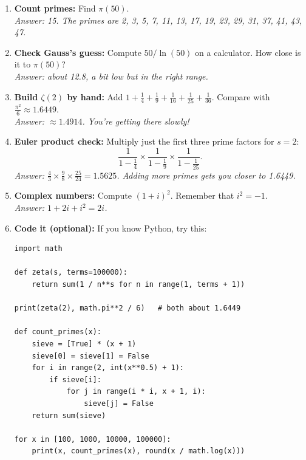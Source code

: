 \documentclass[11pt,a4paper]{article}
\begin{document}
\begin{enumerate}[itemsep=6pt]
  \item \textbf{Count primes:} Find $\pi(50)$.\\
  \emph{Answer: 15. The primes are 2, 3, 5, 7, 11, 13, 17, 19, 23, 29, 31, 37, 41, 43, 47.}

  \item \textbf{Check Gauss's guess:} Compute $50/\ln(50)$ on a calculator. How close is it to $\pi(50)$?\\
  \emph{Answer: about 12.8, a bit low but in the right range.}

  \item \textbf{Build $\zeta(2)$ by hand:} Add $1 + \frac14 + \frac19 + \frac1{16} + \frac1{25} + \frac1{36}$. Compare with $\frac{\pi^2}{6} \approx 1.6449$.\\
  \emph{Answer: $\approx 1.4914$. You're getting there slowly!}

  \item \textbf{Euler product check:} Multiply just the first three prime factors for $s = 2$:
  \[
  \frac{1}{1-\frac14}\times\frac{1}{1-\frac19}\times\frac{1}{1-\frac1{25}}.
  \]
  \emph{Answer: $\frac43\times\frac98\times\frac{25}{24} = 1.5625$. Adding more primes gets you closer to 1.6449.}

  \item \textbf{Complex numbers:} Compute $(1+i)^2$. Remember that $i^2 = -1$.\\
  \emph{Answer: $1 + 2i + i^2 = 2i$.}

  \item \textbf{Code it (optional):} If you know Python, try this:
\begin{lstlisting}
import math

def zeta(s, terms=100000):
    return sum(1 / n**s for n in range(1, terms + 1))

print(zeta(2), math.pi**2 / 6)   # both about 1.6449

def count_primes(x):
    sieve = [True] * (x + 1)
    sieve[0] = sieve[1] = False
    for i in range(2, int(x**0.5) + 1):
        if sieve[i]:
            for j in range(i * i, x + 1, i):
                sieve[j] = False
    return sum(sieve)

for x in [100, 1000, 10000, 100000]:
    print(x, count_primes(x), round(x / math.log(x)))
\end{lstlisting}
\end{enumerate}

\end{document}
